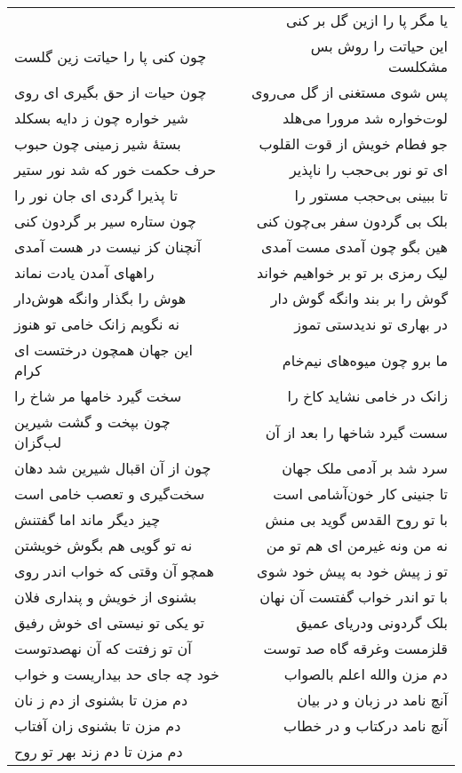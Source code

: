 \begin{center}
\begin{longtable}{l p{0.5cm} r}
&&
یا مگر پا را ازین گل بر کنی
\\
چون کنی پا را حیاتت زین گلست
&&
این حیاتت را روش بس مشکلست
\\
چون حیات از حق بگیری ای روی
&&
پس شوی مستغنی از گل می‌روی
\\
شیر خواره چون ز دایه بسکلد
&&
لوت‌خواره شد مرورا می‌هلد
\\
بستهٔ شیر زمینی چون حبوب
&&
جو فطام خویش از قوت القلوب
\\
حرف حکمت خور که شد نور ستیر
&&
ای تو نور بی‌حجب را ناپذیر
\\
تا پذیرا گردی ای جان نور را
&&
تا ببینی بی‌حجب مستور را
\\
چون ستاره سیر بر گردون کنی
&&
بلک بی گردون سفر بی‌چون کنی
\\
آنچنان کز نیست در هست آمدی
&&
هین بگو چون آمدی مست آمدی
\\
راههای آمدن یادت نماند
&&
لیک رمزی بر تو بر خواهیم خواند
\\
هوش را بگذار وانگه هوش‌دار
&&
گوش را بر بند وانگه گوش دار
\\
نه نگویم زانک خامی تو هنوز
&&
در بهاری تو ندیدستی تموز
\\
این جهان همچون درختست ای کرام
&&
ما برو چون میوه‌های نیم‌خام
\\
سخت گیرد خامها مر شاخ را
&&
زانک در خامی نشاید کاخ را
\\
چون بپخت و گشت شیرین لب‌گزان
&&
سست گیرد شاخها را بعد از آن
\\
چون از آن اقبال شیرین شد دهان
&&
سرد شد بر آدمی ملک جهان
\\
سخت‌گیری و تعصب خامی است
&&
تا جنینی کار خون‌آشامی است
\\
چیز دیگر ماند اما گفتنش
&&
با تو روح القدس گوید بی منش
\\
نه تو گویی هم بگوش خویشتن
&&
نه من ونه غیرمن ای هم تو من
\\
همچو آن وقتی که خواب اندر روی
&&
تو ز پیش خود به پیش خود شوی
\\
بشنوی از خویش و پنداری فلان
&&
با تو اندر خواب گفتست آن نهان
\\
تو یکی تو نیستی ای خوش رفیق
&&
بلک گردونی ودریای عمیق
\\
آن تو زفتت که آن نهصدتوست
&&
قلزمست وغرقه گاه صد توست
\\
خود چه جای حد بیداریست و خواب
&&
دم مزن والله اعلم بالصواب
\\
دم مزن تا بشنوی از دم ز نان
&&
آنچ نامد در زبان و در بیان
\\
دم مزن تا بشنوی زان آفتاب
&&
آنچ نامد درکتاب و در خطاب
\\
دم مزن تا دم زند بهر تو روح

\end{longtable}
\end{center}
